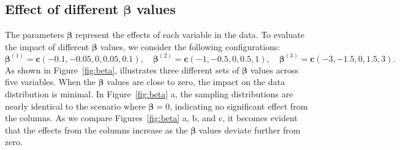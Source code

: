\documentclass{article}
\begin{document}
\subsection{Effect of different $\bm{\beta}$ values}
The parameters $\bm{\beta}$ represent the effects of each variable in the data. 
To evaluate the impact of different $\bm{\beta}$ values, we consider the following configurations:
\[
\bm{\beta}^{(1)} = \mathbf{c}(-0.1, -0.05, 0, 0.05, 0.1), \quad 
\bm{\beta}^{(2)} = \mathbf{c}(-1, -0.5, 0, 0.5, 1), \quad 
\bm{\beta}^{(3)} = \mathbf{c}(-3, -1.5, 0, 1.5, 3).
\]
As shown in Figure~\ref{fig:beta},  illustrates three different sets of $\bm{\beta}$ values across five variables. 
When the $\bm{\beta}$ values are close to zero, the impact on the data distribution is minimal. 
In Figure~\ref{fig:beta} a, the sampling distributions are nearly identical to the scenario where $\bm{\beta} = 0$, 
indicating no significant effect from the columns. 
As we compare Figures~\ref{fig:beta} a, b, and c, it becomes evident that the effects 
from the columns increase as the $\bm{\beta}$ values deviate further from zero.
\end{document}
